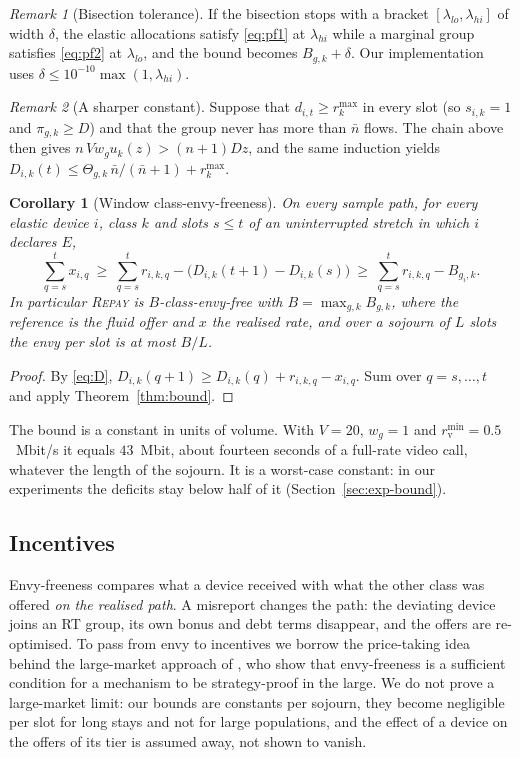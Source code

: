 \documentclass[preprint,11pt]{elsarticle}
\newtheorem{corollary}{Corollary}
\theoremstyle{definition}
\theoremstyle{remark}
\newtheorem{remark}{Remark}
\newcommand{\rmin}{r^{\min}}
\newcommand{\rmax}{r^{\max}}
\newcommand{\repay}{\textsc{Repay}}
\begin{document}
\begin{remark}[Bisection tolerance]\label{rem:tol}
If the bisection stops with a bracket $[\lambda_{lo},\lambda_{hi}]$ of width $\delta$, the elastic allocations satisfy \eqref{eq:pf1} at $\lambda_{hi}$ while a marginal group satisfies \eqref{eq:pf2} at $\lambda_{lo}$, and the bound becomes $B_{g,k}+\delta$. Our implementation uses $\delta\le10^{-10}\max(1,\lambda_{hi})$.
\end{remark}

\begin{remark}[A sharper constant]\label{rem:sharp}
Suppose that $d_{i,t}\ge\rmax_k$ in every slot (so $s_{i,k}=1$ and $\pi_{g,k}\ge D$) and that the group never has more than $\bar n$ flows. The chain above then gives $n\,Vw_gu_k(z)>(n+1)Dz$, and the same induction yields $D_{i,k}(t)\le\Theta_{g,k}\,\bar n/(\bar n+1)+\rmax_k$.
\end{remark}

\begin{corollary}[Window class-envy-freeness]\label{cor:window}
On every sample path, for every elastic device $i$, class $k$ and slots $s\le t$ of an uninterrupted stretch in which $i$ declares $E$,
\[
\sum_{q=s}^{t}x_{i,q}\ \ge\ \sum_{q=s}^{t}r_{i,k,q}-\big(D_{i,k}(t+1)-D_{i,k}(s)\big)\ \ge\ \sum_{q=s}^{t}r_{i,k,q}-B_{g_i,k}.
\]
In particular \repay{} is $B$-class-envy-free with $B=\max_{g,k}B_{g,k}$, where the reference is the fluid offer and $x$ the realised rate, and over a sojourn of $L$ slots the envy per slot is at most $B/L$.
\end{corollary}
\begin{proof}
By \eqref{eq:D}, $D_{i,k}(q+1)\ge D_{i,k}(q)+r_{i,k,q}-x_{i,q}$. Sum over $q=s,\dots,t$ and apply Theorem~\ref{thm:bound}.
\end{proof}

The bound is a constant in units of volume. With $V=20$, $w_g=1$ and $\rmin_{\mathrm{v}}=0.5$~Mbit/s it equals $43$~Mbit, about fourteen seconds of a full-rate video call, whatever the length of the sojourn. It is a worst-case constant: in our experiments the deficits stay below half of it (Section~\ref{sec:exp-bound}).

\subsection{Incentives}\label{sec:ic}

Envy-freeness compares what a device received with what the other class was offered \emph{on the realised path}.
A misreport changes the path: the deviating device joins an RT group, its own bonus and debt terms disappear, and the offers are re-optimised.
To pass from envy to incentives we borrow the price-taking idea behind the large-market approach of \citet{azevedo2019strategy}, who show that envy-freeness is a sufficient condition for a mechanism to be strategy-proof in the large.
We do not prove a large-market limit: our bounds are constants per sojourn, they become negligible per slot for long stays and not for large populations, and the effect of a device on the offers of its tier is assumed away, not shown to vanish.
\end{document}
